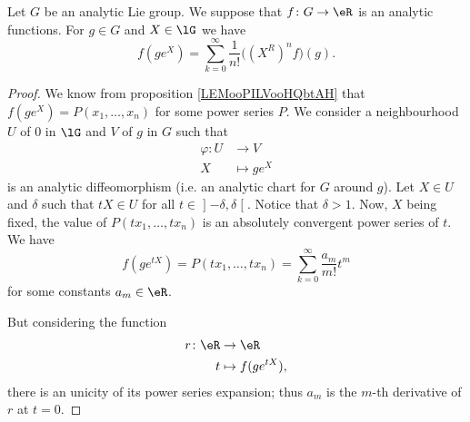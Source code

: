 \begin{proposition}     \label{PROPooIYWQooZJtKiu}
    Let \( G\) be an analytic Lie group. We suppose that \( f\colon G\to \eR\) is an analytic functions. For \( g\in G\) and \( X\in \lG\) we have
    \begin{equation}
        f(g e^{X})=\sum_{k=0}^{\infty}\frac{1}{ n! }\big( (X^R)^nf \big)(g).
    \end{equation}
\end{proposition}

\begin{proof}
    We know from proposition \ref{LEMooPILVooHQbtAH} that \( f(g e^{X})=P(x_1,\ldots, x_n)\) for some power series \( P\). We consider a neighbourhood \( U\) of \( 0\) in \( \lG\) and \( V\) of \( g\) in \( G\) such that
    \begin{equation}
        \begin{aligned}
            \varphi\colon U&\to V \\
            X&\mapsto  ge^{X} 
        \end{aligned}
    \end{equation}
is an analytic diffeomorphism (i.e. an analytic chart for \( G\) around \( g\)). Let \( X\in U\) and \( \delta\) such that \( tX\in U\) for all \( t\in \mathopen] -\delta , \delta \mathclose[\). Notice that \( \delta>1\). Now, \( X\) being fixed, the value of \( P(tx_1,\ldots, tx_n)\) is an absolutely convergent power series of \( t\). We have
    \begin{equation}
        f(g e^{tX})=P(tx_1,\ldots, tx_n)=\sum_{k=0}^{\infty}\frac{ a_m }{ m! }t^m
    \end{equation}
    for some constants \( a_m\in \eR\).

    But considering the function
    \begin{equation}
        \begin{aligned}
            r\colon \eR&\to \eR \\
            t&\mapsto f(g e^{tX}), 
        \end{aligned}
    \end{equation}
    there is an unicity of its power series expansion; thus \( a_m\) is the \( m\)-th derivative of \( r\) at \( t=0\).


\end{proof}

